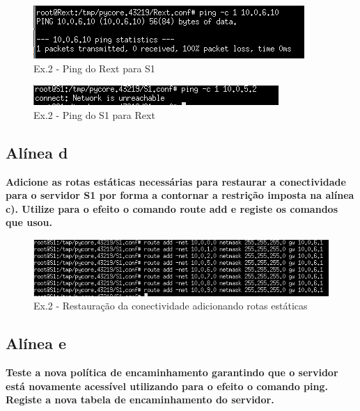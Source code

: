 \documentclass[a4paper]{report}
\begin{document}
\begin{figure}[H]
    \centering 
    \includegraphics[width=\textwidth]{images/pingRextS1.png}
    \caption{Ex.2 - Ping do Rext para S1}
    \label{fig:pingRextS1}
\end{figure}

\begin{figure}[H]
    \centering 
    \includegraphics[width=\textwidth]{images/pingS1Rext.png}
    \caption{Ex.2 - Ping do S1 para Rext}
    \label{fig:pingS1Rext}
\end{figure}

\subsection{Alínea d}
\textbf{Adicione as rotas estáticas necessárias para restaurar a conectividade
para o servidor S1 por forma a contornar a restrição imposta na alínea c).
Utilize para o efeito o comando route add e registe os comandos que usou.}

\begin{figure}[H]
    \centering 
    \includegraphics[width=\textwidth]{images/routeAdd.png}
    \caption{Ex.2 - Restauração da conectividade adicionando rotas estáticas}
    \label{fig:routeAdd}
\end{figure}

\subsection{Alínea e}
\textbf{Teste a nova política de encaminhamento garantindo que o servidor está
novamente acessível utilizando para o efeito o comando ping. Registe a nova
tabela de encaminhamento do servidor.}
\end{document}
